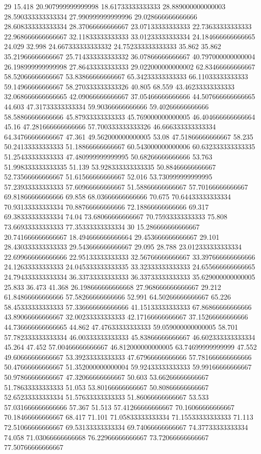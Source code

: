 29 15.418 20.907999999999998 18.61733333333333 28.889000000000003 28.590333333333334 27.990999999999996 29.028666666666666 28.608333333333334 28.37066666666667 23.07133333333333 22.73633333333333 22.968666666666667 32.11833333333333 33.01233333333334 24.184666666666665 24.029 32.998 24.667333333333332 24.752333333333333 35.862 35.862 35.21966666666667 25.714333333333332 36.07866666666667 40.797000000000004 26.198999999999998 27.86433333333333 29.022000000000002 62.83466666666667 58.52066666666667 53.83866666666667 65.34233333333333 66.11033333333333 59.14966666666667 58.270333333333326 40.805 68.559 43.46233333333333 32.068666666666665 42.09066666666667 37.05466666666666 44.507666666666665 44.603 47.31733333333334 59.90366666666666 59.40266666666666 58.58866666666666 45.87933333333333 45.769000000000005 46.404666666666664 45.16 47.281666666666666 57.700333333333326 46.666333333333334 64.34766666666667 47.361 49.562000000000005 53.08 47.51866666666667 58.235 50.24133333333333 51.18866666666667 60.543000000000006 60.632333333333335 51.25433333333333 47.480999999999995 50.68266666666666 53.763 51.998333333333335 51.139 53.928333333333335 50.88466666666667 52.73566666666667 51.61566666666667 52.016 53.730999999999995 57.23933333333333 57.60966666666667 51.58866666666667 57.70166666666667 69.81866666666666 69.858 68.03666666666666 70.675 70.64433333333334 70.93133333333334 70.88766666666666 72.18866666666666 69.317 69.38333333333334 74.04 73.68066666666667 70.75933333333333 75.808 73.66933333333333 77.35333333333334
30 15.286666666666667 20.741666666666667 18.494666666666664 29.453666666666667 29.101 28.430333333333333 29.543666666666667 29.095 28.788 23.012333333333334 22.699666666666666 22.95133333333333 32.56766666666667 33.397666666666666 24.12633333333333 24.045333333333335 33.32333333333333 24.655666666666665 24.794333333333334 36.33733333333333 36.33733333333333 35.629000000000005 25.833 36.473 41.368 26.198666666666668 27.968666666666667 29.212 61.84866666666666 57.58266666666666 52.991 64.50266666666667 65.226 58.45333333333333 57.336666666666666 41.15133333333333 67.86866666666666 43.89066666666667 32.00233333333333 42.17166666666667 37.15266666666666 44.736666666666665 44.862 47.47633333333333 59.059000000000005 58.701 57.782333333333334 46.00333333333333 45.83866666666667 46.602333333333334 45.264 47.452 57.00466666666667 46.812000000000005 63.74699999999999 47.552 49.60666666666667 53.39233333333333 47.67966666666666 57.781666666666666 50.47666666666667 51.352000000000004 59.92433333333333 59.99166666666667 50.97866666666667 47.32066666666667 50.603 53.66266666666667 51.78633333333333 51.053 53.80166666666667 50.80866666666667 52.65233333333334 51.57633333333333 51.86066666666667 53.533 57.031666666666666 57.367 51.513 57.41266666666667 70.16066666666667 70.18466666666667 68.417 71.101 71.05833333333334 71.15533333333333 71.113 72.51066666666667 69.53133333333334 69.74066666666667 74.37733333333334 74.058 71.03066666666668 76.22966666666667 73.72066666666667 77.50766666666667
